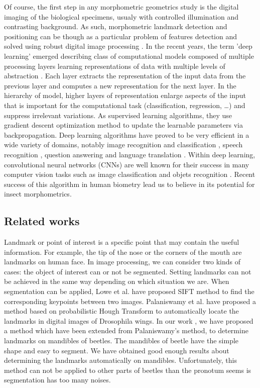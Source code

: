 \documentclass[review]{elsarticle}
\begin{document}
Of course, the first step in any morphometric geometrics study is the digital imaging of the biological specimens, usualy with controlled illumination and contrasting background. As such, morphometric landmark detection and positioning can be though as a particular problem of features detection and solved using robust digital image processing \cite{gonzalez_digital_2006}. In the recent years, the term 'deep learning' emerged describing class of computational models composed of multiple processing layers learning representations of data with multiple levels of abstraction \cite{lecun2015deep}. Each layer extracts the representation of the input data from the previous layer and computes a new representation for the next layer. In the hierarchy of model, higher layers of representation enlarge aspects of the input that is important for the computational task (classification, regression, \ldots) and suppress irrelevant variations. As supervised learning algorithms, they use gradient descent optimization method to update the learnable parameters via backpropagation. Deep learning algorithms have proved to be very efficient in a wide variety of domains, notably image recognition and classification \cite{krizhevsky2012imagenet,ciregan2012multi,szegedy2015going}, speech recognition \cite{mikolov2011strategies,hinton2012deep,sainath2013deep}, question answering \cite{bordes2014question} and language translation \cite{sutskever2014sequence} \cite{jean2014using}.
Within deep learning, convolutional neural networks (CNNs) are well known for their success in many computer vision tasks such as image classification \cite{krizhevsky2012imagenet,ciregan2012multi} and  objets recognition \cite{li2015convolutional,tompson2014joint}.
Recent success of this algorithm in human biometry \cite{cintas2016automatic} lead us to believe in its potential for insect morphometrics.  

\subsection{Related works}\label{rw}

Landmark or point of interest is a specific point that may contain the useful information. For example, the tip of the nose or the corners of the mouth are landmarks on human face. In image processing, we can consider two kinds of cases: the object of interest can or not be segmented. Setting landmarks can not be achieved in the same way depending on which situation we are. When segmentation can be applied, Lowe et al. \cite{lowe2004distinctive} have proposed SIFT method to find the corresponding keypoints between two images. Palaniswamy et al. \cite{palaniswamy2010automatic} have proposed a method based on probabilistic Hough Transform to automatically locate the landmarks in digital images of Drosophila wings. In our work \cite{le2017maelab}, we have proposed a method which have been extended from Palaniswamy's method, to determine landmarks on mandibles of beetles. The mandibles of beetle have the simple shape and easy to segment. We have obtained good enough results about determining the landmarks automatically on mandibles. Unfortunately, this method can not be applied to other parts of beetles than the pronotum seems is segmentation has too many noises.
\end{document}
